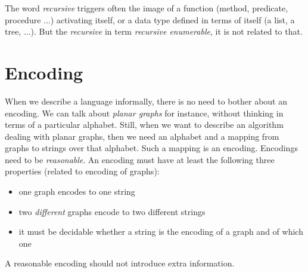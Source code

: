 The word {\em recursive} triggers often the image of a function
(method, predicate, procedure ...) activating itself, or a data type
defined in terms of itself (a list, a tree, ...). But the {\em
  recursive} in term {\em recursive enumerable}, it is not related to
that.



\section{Encoding}

When we describe a language informally, there is no need to bother
about an encoding. We can talk about {\em planar graphs} for instance,
without thinking in terms of a particular alphabet. Still, when we
want to describe an algorithm dealing with planar graphs, then we need
an alphabet and a mapping from graphs to strings over that alphabet.
Such a mapping is an encoding. Encodings need to be {\em
  reasonable}. An encoding must have at least the following three
properties (related to encoding of graphs):
\begin{itemize}
\item one graph encodes to one string
\item two {\em different} graphs encode to two different strings
\item it must be decidable whether a string is the encoding of a graph
  and of which one
\end{itemize}
A reasonable encoding should not introduce extra information.

